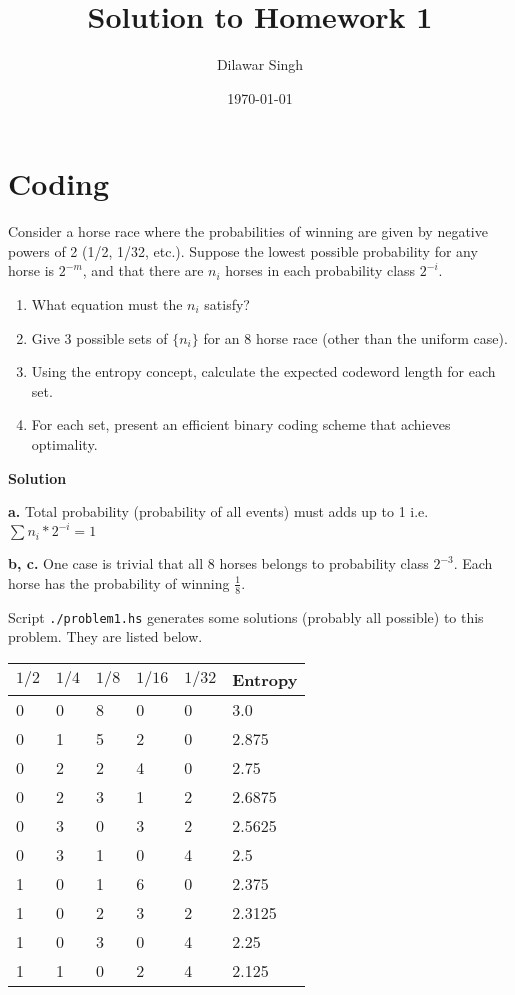 \documentclass[]{article}
\title{Solution to Homework 1}
\author{Dilawar Singh}
\date{\today}
\providecommand{\tightlist}{%
\setlength{\itemsep}{0pt}\setlength{\parskip}{0pt}}
\begin{document}
\maketitle

\section{Coding}\label{coding}

Consider a horse race where the probabilities of winning are given by
negative powers of 2 (1/2, 1/32, etc.). Suppose the lowest possible
probability for any horse is \(2^{-m}\), and that there are \(n_i\)
horses in each probability class \(2^{-i}\).

\begin{enumerate}
\def\labelenumi{\alph{enumi}.}
\tightlist
\item
  What equation must the \(n_i\) satisfy?
\item
  Give 3 possible sets of \(\{n_i\}\) for an 8 horse race (other than
  the uniform case).
\item
  Using the entropy concept, calculate the expected codeword length for
  each set.
\item
  For each set, present an efficient binary coding scheme that achieves
  optimality.
\end{enumerate}

\textbf{Solution}

\textbf{a.} Total probability (probability of all events) must adds up
to 1 i.e. \(\sum n_i * 2^{-i} = 1\)

\textbf{b, c.} One case is trivial that all 8 horses belongs to
probability class \(2^{-3}\). Each horse has the probability of winning
\(\frac{1}{8}\).

Script \texttt{./problem1.hs} generates some solutions (probably all
possible) to this problem. They are listed below.

\begin{longtable}[]{@{}llllll@{}}
\toprule
\(1/2\) & \(1/4\) & \(1/8\) & \(1/16\) & \(1/32\) &
Entropy\tabularnewline
\midrule
\endhead
0 & 0 & 8 & 0 & 0 & 3.0\tabularnewline
0 & 1 & 5 & 2 & 0 & 2.875\tabularnewline
0 & 2 & 2 & 4 & 0 & 2.75\tabularnewline
0 & 2 & 3 & 1 & 2 & 2.6875\tabularnewline
0 & 3 & 0 & 3 & 2 & 2.5625\tabularnewline
0 & 3 & 1 & 0 & 4 & 2.5\tabularnewline
1 & 0 & 1 & 6 & 0 & 2.375\tabularnewline
1 & 0 & 2 & 3 & 2 & 2.3125\tabularnewline
1 & 0 & 3 & 0 & 4 & 2.25\tabularnewline
1 & 1 & 0 & 2 & 4 & 2.125\tabularnewline
\bottomrule
\end{longtable}
\end{document}
